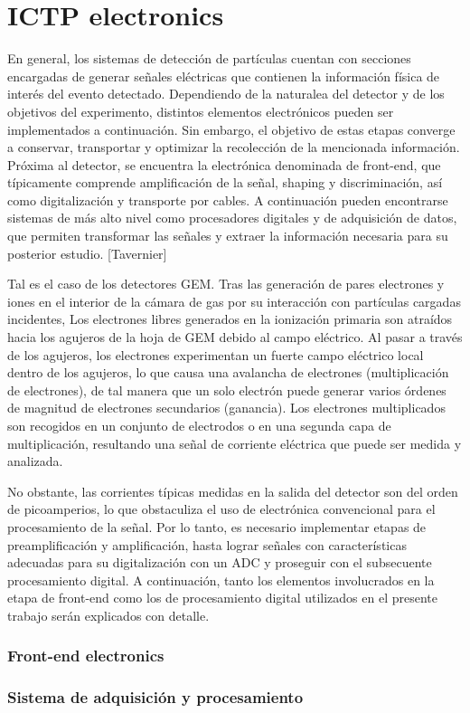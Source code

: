 \documentclass[]{book}
\begin{document}
\chapter{ICTP electronics}

\noindent En general, los sistemas de detección de partículas cuentan con secciones encargadas de generar señales eléctricas que contienen la información física de interés del evento detectado. Dependiendo de la naturalea del detector y de los objetivos del experimento, distintos elementos electrónicos pueden ser implementados a continuación. Sin embargo, el objetivo de estas etapas converge a conservar, transportar y optimizar la recolección de la mencionada información. Próxima al detector, se encuentra la electrónica denominada de front-end, que típicamente comprende amplificación de la señal, shaping y discriminación, así como digitalización y transporte por cables. A continuación pueden encontrarse sistemas de más alto nivel como procesadores digitales y de adquisición de datos, que permiten transformar las señales y extraer la información necesaria para su posterior estudio. [Tavernier]

\noindent Tal es el caso de los detectores GEM. Tras las generación de pares electrones y iones en el interior de la cámara de gas por su interacción con partículas cargadas incidentes, Los electrones libres generados en la ionización primaria son atraídos hacia los agujeros de la hoja de GEM debido al campo eléctrico. Al pasar a través de los agujeros, los electrones experimentan un fuerte campo eléctrico local dentro de los agujeros, lo que causa una avalancha de electrones (multiplicación de electrones), de tal manera que un solo electrón puede generar varios órdenes de magnitud de electrones secundarios (ganancia). Los electrones multiplicados son recogidos en un conjunto de electrodos o en una segunda capa de multiplicación, resultando una señal de corriente eléctrica que puede ser medida y analizada.

\noindent No obstante, las corrientes típicas medidas en la salida del detector son del orden de picoamperios, lo que obstaculiza el uso de electrónica convencional para el procesamiento de la señal. Por lo tanto, es necesario implementar etapas de preamplificación y amplificación, hasta lograr señales con características adecuadas para su digitalización con un ADC y proseguir con el subsecuente procesamiento digital. A continuación, tanto los elementos involucrados en la etapa de front-end como los de procesamiento digital utilizados en el presente trabajo serán explicados con detalle.

\subsection*{Front-end electronics}
\subsection*{Sistema de adquisición y procesamiento}

\noindent 
\end{document}

